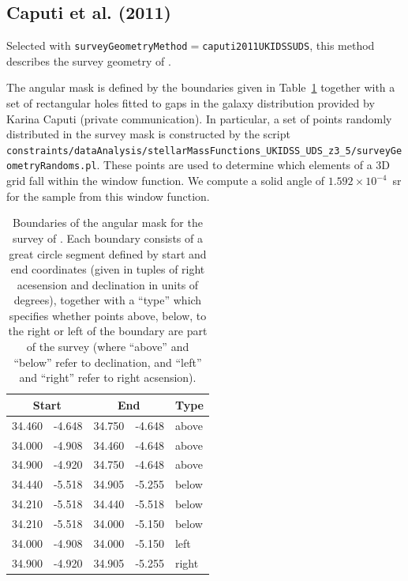 \subsection{Caputi et al. (2011)}\label{phys:surveyGeometry:surveyGeometryCaputi2011UKIDSSUDS}

Selected with {\tt surveyGeometryMethod}$=${\tt caputi2011UKIDSSUDS}, this method describes the survey geometry of \cite{caputi_stellar_2011}. 

The angular mask is defined by the boundaries given in Table~\ref{tb:CaputiSurveyBoundaries} together with a set of rectangular holes fitted to gaps in the galaxy distribution provided by Karina Caputi (private communication). In particular, a set of points randomly distributed in the survey mask is constructed by the script {\tt constraints/dataAnalysis/stellarMassFunctions\_UKIDSS\_UDS\_z3\_5/surveyGeometryRandoms.pl}. These points are used to determine which elements of a 3D grid fall within the window function. We compute a solid angle of $1.592\times 10^{-4}$~sr for the sample from this window function.

\begin{table}
\caption{Boundaries of the angular mask for the survey of \protect\cite{caputi_stellar_2011}. Each boundary consists of a great circle segment defined by start and end coordinates (given in tuples of right acesension and declination in units of degrees), together with a ``type'' which specifies whether points above, below, to the right or left of the boundary are part of the survey (where ``above'' and ``below'' refer to declination, and ``left'' and ``right'' refer to right acsension).}
\label{tb:CaputiSurveyBoundaries}
\begin{center}
\begin{tabular}{@{(}r@{,}l@{)\;(}r@{,}l@{)\;}l}
\hline
\multicolumn{2}{c}{\bf Start} & \multicolumn{2}{c}{\bf End} & {\bf Type} \\
\hline
 34.460 & -4.648 & 34.750 & -4.648 & above \\
 34.000 & -4.908 & 34.460 & -4.648 & above \\
 34.900 & -4.920 & 34.750 & -4.648 & above \\
 34.440 & -5.518 & 34.905 & -5.255 & below \\
 34.210 & -5.518 & 34.440 & -5.518 & below \\
 34.210 & -5.518 & 34.000 & -5.150 & below \\
 34.000 & -4.908 & 34.000 & -5.150 & left  \\
 34.900 & -4.920 & 34.905 & -5.255 & right \\
\hline
\end{tabular}
\end{center}
\end{table}

